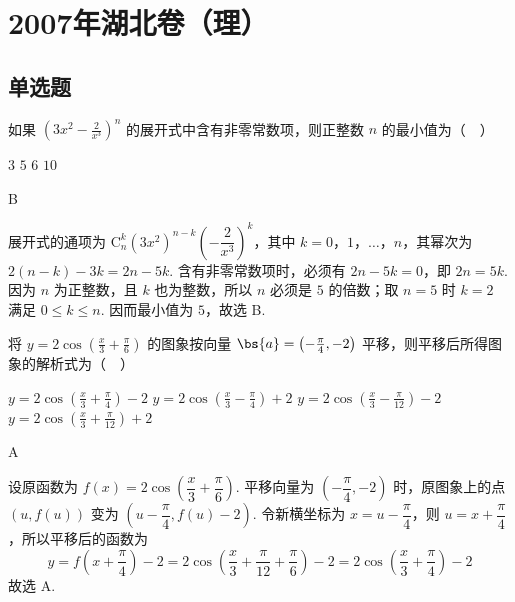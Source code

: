 \chapter{2007年湖北卷（理）}

\section{单选题}

\begin{problem}
如果 \( \left(3x^{2}-\frac{2}{x^{3}}\right)^{n} \) 的展开式中含有非零常数项，则正整数 \(n\) 的最小值为（\(\quad\)）

\choices
    {\(3\)}
    {\(5\)}
    {\(6\)}
    {\(10\)}
\end{problem}

\begin{answer}
B
\end{answer}

\begin{solution}
展开式的通项为 \(\mathrm C_n^k(3x^2)^{n-k}\left(-\dfrac{2}{x^3}\right)^k\)，其中 \(k=0\)，\(1\)，\(\ldots\)，\(n\)，其幂次为 \(2(n-k)-3k=2n-5k\). 含有非零常数项时，必须有 \(2n-5k=0\)，即 \(2n=5k\). 因为 \(n\) 为正整数，且 \(k\) 也为整数，所以 \(n\) 必须是 \(5\) 的倍数；取 \(n=5\) 时 \(k=2\) 满足 \(0\leqslant k\leqslant n\). 因而最小值为 \(5\)，故选 B.
\end{solution}

\begin{problem}
将 \( y = 2\cos \left(\frac{x}{3} + \frac{\pi}{6}\right) \) 的图象按向量 \( \bs{a} = \left(-\frac{\pi}{4}, -2\right) \) 平移，则平移后所得图象的解析式为（\(\quad\)）

\choices
    {\(y = 2\cos \left(\frac{x}{3} + \frac{\pi}{4}\right) - 2\)}
    {\(y = 2\cos \left(\frac{x}{3} - \frac{\pi}{4}\right) + 2\)}
    {\(y = 2\cos \left(\frac{x}{3} - \frac{\pi}{12}\right) - 2\)}
    {\(y = 2\cos \left(\frac{x}{3} + \frac{\pi}{12}\right) + 2\)}
\end{problem}

\begin{answer}
A
\end{answer}

\begin{solution}
设原函数为 \(f(x)=2\cos\left(\dfrac{x}{3}+\dfrac{\pi}{6}\right)\). 平移向量为 \(\left(-\dfrac{\pi}{4},-2\right)\) 时，原图象上的点 \((u,f(u))\) 变为 \(\left(u-\dfrac{\pi}{4},f(u)-2\right)\). 令新横坐标为 \(x=u-\dfrac{\pi}{4}\)，则 \(u=x+\dfrac{\pi}{4}\)，所以平移后的函数为
\[
y=f\left(x+\frac{\pi}{4}\right)-2=2\cos\left(\frac{x}{3}+\frac{\pi}{12}+\frac{\pi}{6}\right)-2=2\cos\left(\frac{x}{3}+\frac{\pi}{4}\right)-2
\]
故选 A.
\end{solution}

